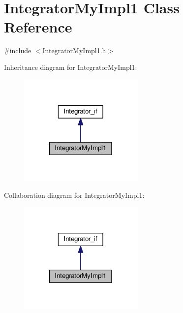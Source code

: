 \hypertarget{class_integrator_my_impl1}{\section{Integrator\-My\-Impl1 Class Reference}
\label{class_integrator_my_impl1}
}


{\ttfamily \#include $<$Integrator\-My\-Impl1.\-h$>$}



Inheritance diagram for Integrator\-My\-Impl1\-:\nopagebreak
\begin{figure}[H]
\begin{center}
\leavevmode
\includegraphics[width=174pt]{class_integrator_my_impl1__inherit__graph}
\end{center}
\end{figure}


Collaboration diagram for Integrator\-My\-Impl1\-:\nopagebreak
\begin{figure}[H]
\begin{center}
\leavevmode
\includegraphics[width=174pt]{class_integrator_my_impl1__coll__graph}
\end{center}
\end{figure}
